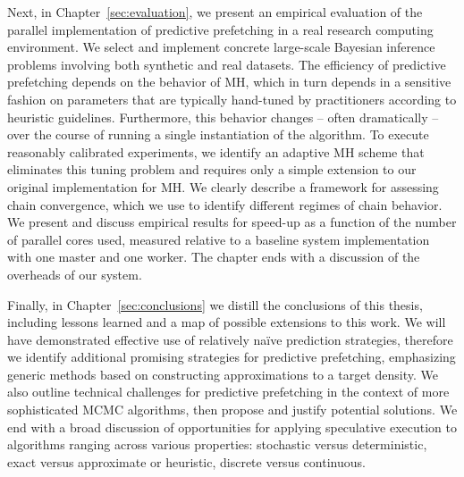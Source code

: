 \documentclass[angelino.tex]{subfiles}
\begin{document}
Next, in Chapter~\ref{sec:evaluation}, we present an empirical evaluation
of the parallel implementation of predictive prefetching
in a real research computing environment.
We select and implement concrete large-scale Bayesian inference problems
involving both synthetic and real datasets.
The efficiency of predictive prefetching depends on the behavior of MH,
which in turn depends in a sensitive fashion on parameters that are
typically hand-tuned by practitioners according to heuristic guidelines.
Furthermore, this behavior changes -- often dramatically -- over the course of
running a single instantiation of the algorithm.
To execute reasonably calibrated experiments,
we identify an adaptive MH scheme that eliminates this tuning problem and
requires only a simple extension to our original implementation for MH.
We clearly describe a framework for assessing chain convergence,
which we use to identify different regimes of chain behavior. 
We present and discuss empirical results for speed-up as a function of
the number of parallel cores used, measured relative to a baseline
system implementation with one master and one worker.
The chapter ends with a discussion of the overheads of our system.

Finally, in Chapter~\ref{sec:conclusions} we distill the conclusions of this
thesis, including lessons learned and a map of possible extensions to this work.
We will have demonstrated effective use of relatively na\"{i}ve prediction
strategies, therefore we identify additional promising strategies for
predictive prefetching, emphasizing generic methods based on
constructing approximations to a target density.
We also outline technical challenges for predictive prefetching
in the context of more sophisticated MCMC algorithms,
then propose and justify potential solutions.
We end with a broad discussion of opportunities for applying
speculative execution to algorithms ranging across various properties:
stochastic versus deterministic, exact versus approximate or heuristic,
discrete versus continuous.

\end{document}
